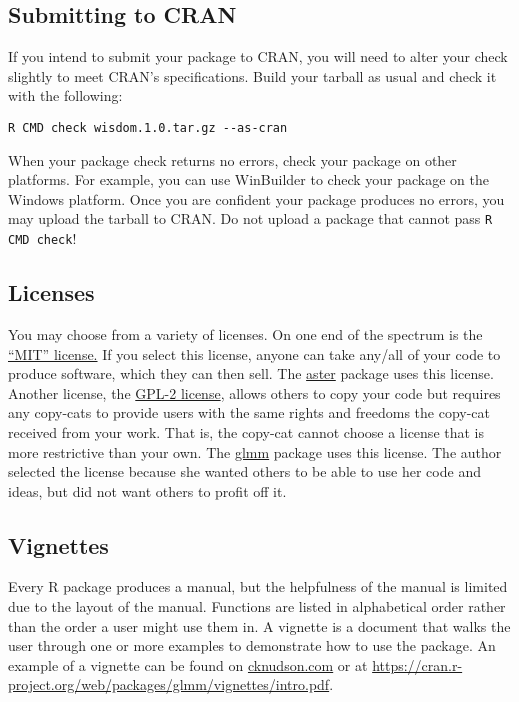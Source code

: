 \documentclass{article}
\begin{document}
\subsection{Submitting to CRAN} If you intend to submit your package to CRAN, you will need to alter your check slightly to meet CRAN's specifications. Build your tarball as usual and check it with the following:
\begin{verbatim}
R CMD check wisdom.1.0.tar.gz --as-cran
\end{verbatim}
When your package check returns no errors, check your package on other platforms. For example, you can use WinBuilder to check your package on the Windows platform. Once you are confident your package produces no errors, you may upload the tarball to CRAN. Do not upload a package that cannot pass \texttt{R CMD check}!


\subsection{Licenses}
You may choose from a variety of licenses. On one end of the spectrum is the \href{https://cran.r-project.org/web/licenses/MIT}{``MIT'' license.} If you select this license, anyone can take any/all of your code to produce software, which they can then sell. The \href{https://cran.r-project.org/web/packages/aster/index.html}{aster} package uses this license. \\

Another license, the \href{https://cran.r-project.org/web/licenses/GPL-2}{GPL-2 license}, allows others to copy your code but requires any copy-cats to provide users with the same rights and freedoms the copy-cat received from your  work. That  is, the copy-cat cannot choose a license that is more restrictive than your own. The \href{https://cran.r-project.org/web/packages/glmm/index.html}{glmm} package uses this license. The author selected the license because she wanted others to be able to use her code and ideas, but did not want others to profit off it.  


\subsection{Vignettes}
Every R package produces a manual, but the helpfulness of the manual is limited due to the layout of the manual. Functions are listed in alphabetical order rather than the order a user might use them in. A vignette is a document that walks the user through one or more examples to demonstrate how to use the package. An example of a vignette can be found on \href{cknudson.com}{\url{cknudson.com}} or at  \href{https://cran.r-project.org/web/packages/glmm/vignettes/intro.pdf}{\url{https://cran.r-project.org/web/packages/glmm/vignettes/intro.pdf}}.
\end{document}
